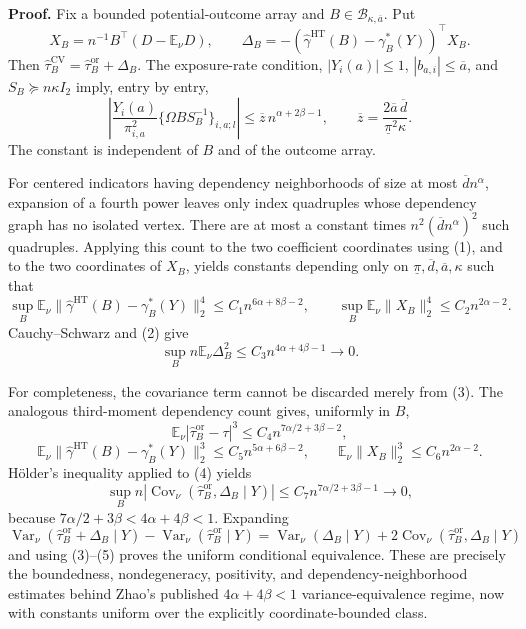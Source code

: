 \textbf{Proof.}
Fix a bounded potential-outcome array and \(B\in\mathcal B_{\kappa,\overline a}\).  Put
\[
X_B=n^{-1}B^{\top}(D-\mathbb E_\nu D),
\qquad
\Delta_B=-(\widehat\gamma^{\mathrm{HT}}(B)-\gamma_B^*(Y))^{\top}X_B.
\]
Then \(\widehat\tau_B^{\mathrm{CV}}=\widehat\tau_B^{\mathrm{or}}+\Delta_B\).  The exposure-rate condition, \(|Y_i(a)|\le1\), \(|b_{a,i}|\le\overline a\), and \(S_B\succeq n\kappa I_2\) imply, entry by entry,
\[
\left|\frac{Y_i(a)}{\pi_{i,a}^2}
\{\Omega B S_B^{-1}\}_{i,a;l}\right|
\le \overline z\,n^{\alpha+2\beta-1},
\qquad
\overline z=\frac{2\overline a\,\overline d}{\underline\pi^2\kappa}. \tag{1}
\]
The constant is independent of \(B\) and of the outcome array.

For centered indicators having dependency neighborhoods of size at most \(\overline d n^\alpha\), expansion of a fourth power leaves only index quadruples whose dependency graph has no isolated vertex.  There are at most a constant times \(n^2(\overline d n^\alpha)^2\) such quadruples.  Applying this count to the two coefficient coordinates using (1), and to the two coordinates of \(X_B\), yields constants depending only on \(\underline\pi,\overline d,\overline a,\kappa\) such that
\[
\sup_B\mathbb E_\nu
\lVert\widehat\gamma^{\mathrm{HT}}(B)-\gamma_B^*(Y)\rVert_2^4
\le C_1n^{6\alpha+8\beta-2},
\qquad
\sup_B\mathbb E_\nu\lVert X_B\rVert_2^4
\le C_2n^{2\alpha-2}. \tag{2}
\]
Cauchy--Schwarz and (2) give
\[
\sup_B n\mathbb E_\nu\Delta_B^2
\le C_3n^{4\alpha+4\beta-1}\longrightarrow0. \tag{3}
\]

For completeness, the covariance term cannot be discarded merely from (3).  The analogous third-moment dependency count gives, uniformly in \(B\),
\[
\mathbb E_\nu|\widehat\tau_B^{\mathrm{or}}-\tau|^3
\le C_4n^{7\alpha/2+3\beta-2},
\]
\[
\mathbb E_\nu\lVert\widehat\gamma^{\mathrm{HT}}(B)-\gamma_B^*(Y)\rVert_2^3
\le C_5n^{5\alpha+6\beta-2},
\qquad
\mathbb E_\nu\lVert X_B\rVert_2^3
\le C_6n^{2\alpha-2}. \tag{4}
\]
Hölder's inequality applied to (4) yields
\[
\sup_B n\left|
\operatorname{Cov}_\nu(\widehat\tau_B^{\mathrm{or}},\Delta_B\mid Y)
\right|
\le C_7n^{7\alpha/2+3\beta-1}\longrightarrow0, \tag{5}
\]
because \(7\alpha/2+3\beta<4\alpha+4\beta<1\).  Expanding
\[
\operatorname{Var}_\nu(\widehat\tau_B^{\mathrm{or}}+\Delta_B\mid Y)
-\operatorname{Var}_\nu(\widehat\tau_B^{\mathrm{or}}\mid Y)
=\operatorname{Var}_\nu(\Delta_B\mid Y)
+2\operatorname{Cov}_\nu(\widehat\tau_B^{\mathrm{or}},\Delta_B\mid Y)
\]
and using (3)--(5) proves the uniform conditional equivalence.  These are precisely the boundedness, nondegeneracy, positivity, and dependency-neighborhood estimates behind Zhao's published \(4\alpha+4\beta<1\) variance-equivalence regime, now with constants uniform over the explicitly coordinate-bounded class.

